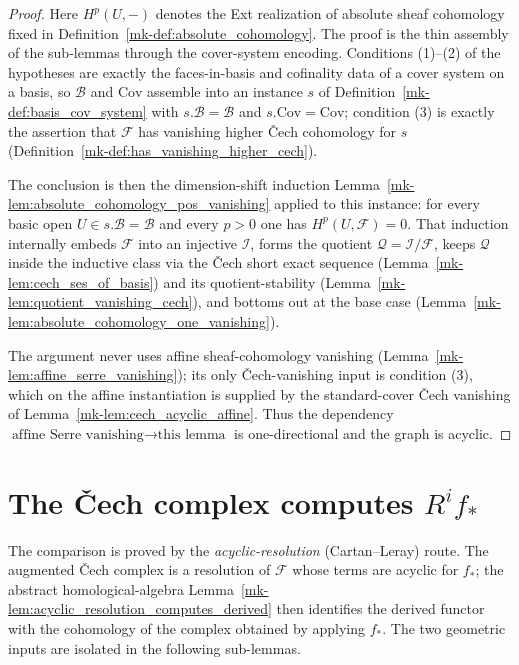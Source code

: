 \begin{proof}
  \leanok
    Here \(H^p(U, -)\) denotes the Ext realization of absolute sheaf cohomology fixed in
  Definition~\ref{mk-def:absolute_cohomology}. The proof is the thin assembly of the sub-lemmas through
  the cover-system encoding. Conditions (1)--(2) of the hypotheses are exactly the faces-in-basis and
  cofinality data of a cover system on a basis, so \(\mathcal{B}\) and \(\mathrm{Cov}\) assemble into
  an instance \(s\) of Definition~\ref{mk-def:basis_cov_system} with \(s.\mathcal{B} = \mathcal{B}\) and
  \(s.\mathrm{Cov} = \mathrm{Cov}\); condition (3) is exactly the assertion that \(\mathcal{F}\) has
  vanishing higher {\v C}ech cohomology for \(s\) (Definition~\ref{mk-def:has_vanishing_higher_cech}).

  The conclusion is then the dimension-shift induction
  Lemma~\ref{mk-lem:absolute_cohomology_pos_vanishing} applied to this instance: for every basic open
  \(U \in s.\mathcal{B} = \mathcal{B}\) and every \(p > 0\) one has \(H^p(U, \mathcal{F}) = 0\). That
  induction internally embeds \(\mathcal{F}\) into an injective \(\mathcal{I}\), forms the quotient
  \(\mathcal{Q} = \mathcal{I}/\mathcal{F}\), keeps \(\mathcal{Q}\) inside the inductive class via the
  {\v C}ech short exact sequence (Lemma~\ref{mk-lem:cech_ses_of_basis}) and its quotient-stability
  (Lemma~\ref{mk-lem:quotient_vanishing_cech}), and bottoms out at the base case
  (Lemma~\ref{mk-lem:absolute_cohomology_one_vanishing}).

  The argument never uses affine sheaf-cohomology vanishing
  (Lemma~\ref{mk-lem:affine_serre_vanishing}); its only {\v C}ech-vanishing input is condition (3),
  which on the affine instantiation is supplied by the standard-cover {\v C}ech vanishing of
  Lemma~\ref{mk-lem:cech_acyclic_affine}. Thus the dependency
  \(\text{affine Serre vanishing} \to \text{this lemma}\) is one-directional and the graph is
  acyclic.
\end{proof}

\section{The {\v C}ech complex computes $R^i f_*$}

The comparison is proved by the \emph{acyclic-resolution} (Cartan--Leray) route. The
augmented {\v C}ech complex is a resolution of \(\mathcal{F}\) whose terms are
acyclic for \(f_*\); the abstract homological-algebra
Lemma~\ref{mk-lem:acyclic_resolution_computes_derived} then identifies the derived
functor with the cohomology of the complex obtained by applying \(f_*\). The two
geometric inputs are isolated in the following sub-lemmas.

